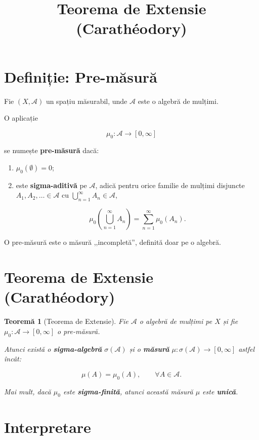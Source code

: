 \documentclass[12pt]{article}
\title{Teorema de Extensie (Carathéodory)}
\author{}
\date{}
\theoremstyle{plain}
\newtheorem{theorem}{Teoremă}
\begin{document}
\maketitle

\section{Definiție: Pre-măsură}

Fie $(X, \mathcal{A})$ un spațiu măsurabil, unde $\mathcal{A}$ este o
algebră de mulțimi.

O aplicație


\[
\mu_0 : \mathcal{A} \to [0, \infty]
\]


se numește \textbf{pre-măsură} dacă:

\begin{enumerate}
    \item $\mu_0(\emptyset) = 0$;
    \item este \textbf{sigma-aditivă} pe $\mathcal{A}$, adică pentru orice familie
    de mulțimi disjuncte $A_1, A_2, \dots \in \mathcal{A}$ cu
    $\bigcup_{n=1}^\infty A_n \in \mathcal{A}$,
    

\[
        \mu_0\!\left(\bigcup_{n=1}^\infty A_n\right)
        = \sum_{n=1}^\infty \mu_0(A_n).
    \]


\end{enumerate}

O pre-măsură este o măsură ,,incompletă'', definită doar pe o algebră.

\section{Teorema de Extensie (Carathéodory)}

\begin{theorem}[Teorema de Extensie]
Fie $\mathcal{A}$ o algebră de mulțimi pe $X$ și fie
$\mu_0 : \mathcal{A} \to [0,\infty]$ o pre-măsură.

Atunci există o \textbf{sigma-algebră} $\sigma(\mathcal{A})$ și o
\textbf{măsură} $\mu : \sigma(\mathcal{A}) \to [0,\infty]$ astfel încât:



\[
\mu(A) = \mu_0(A), \qquad \forall A \in \mathcal{A}.
\]



Mai mult, dacă $\mu_0$ este \textbf{sigma-finită}, atunci această măsură
$\mu$ este \textbf{unică}.
\end{theorem}

\section{Interpretare}
\end{document}
